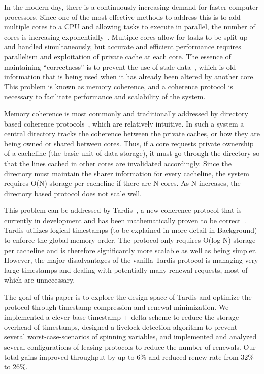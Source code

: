 \documentclass[12pt]{article}
\begin{document}
In the modern day, there is a continuously increasing demand for 
faster computer processors. Since one of the most effective methods to 
address this is to add multiple cores to a CPU and allowing tasks to 
execute in parallel, the number of cores is increasing 
exponentially~\cite{tilera, xeonphi}. 
% 
Multiple cores allow for tasks to be split up and handled 
simultaneously, but accurate and efficient performance requires 
parallelism and exploitation of private cache at each core.  The 
essence of maintaining ``correctness'' is to prevent the use of stale 
data~\cite{lamport1978}, which is old information that is being used 
when it has already been altered by another core. This problem is 
known as memory coherence, and a coherence protocol is necessary to 
facilitate performance and scalability of the system.

Memory coherence is most commonly and traditionally addressed by 
directory based coherence protocols~\cite{censier1978, tang1976}, 
which are relatively intuitive. In such a system a central directory
tracks the coherence between the private caches, or how they are being
owned or shared between cores. Thus, if a core requests private
ownership of a cacheline (the basic unit of data storage), it must
go through the directory so that the lines cached in other cores are 
invalidated accordingly. Since the directory must maintain the sharer 
information for every cacheline, the system requires O(N) storage per 
cacheline if there are N cores.  As N increases, the directory based 
protocol does not scale well.

This problem can be addressed by Tardis~\cite{tardis}, a new coherence 
protocol that is currently in development and has been mathematically 
proven to be correct~\cite{tardis-proof}. Tardis utilizes logical 
timestamps (to be explained in more detail in Background) to enforce 
the global memory order. The protocol only requires O(log N) storage 
per cacheline and is therefore significantly more scalable as well as 
being simpler. However, the major disadvantages of the vanilla Tardis 
protocol is managing very large timestamps and dealing with 
potentially many renewal requests, most of which are unnecessary. 

The goal of this paper is to explore the design space of Tardis and 
optimize the protocol through timestamp compression and renewal 
minimization. We implemented a clever base timestamp + delta scheme to 
reduce the storage overhead of timestamps, designed a livelock 
detection algorithm to prevent several worst-case-scenarios of 
spinning variables, and implemented and analyzed several 
configurations of leasing protocols to reduce the number of renewals. Our total gains improved throughput by up to 6\% and reduced renew rate from 32\% to 26\%.
\end{document}

